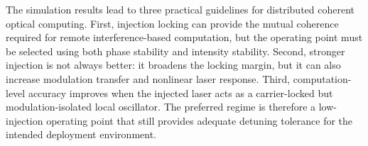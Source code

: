 The simulation results lead to three practical guidelines for distributed coherent optical computing. First, injection locking can provide the mutual coherence required for remote interference-based computation, but the operating point must be selected using both phase stability and intensity stability. Second, stronger injection is not always better: it broadens the locking margin, but it can also increase modulation transfer and nonlinear laser response. Third, computation-level accuracy improves when the injected laser acts as a carrier-locked but modulation-isolated local oscillator. The preferred regime is therefore a low-injection operating point that still provides adequate detuning tolerance for the intended deployment environment.

